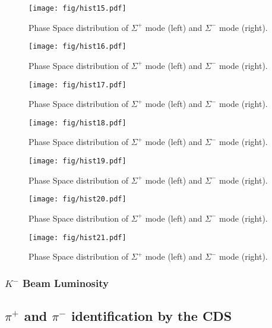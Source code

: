 \begin{figure}
\texttt{[image: fig/hist15.pdf]}
\caption{Phase Space distribution of $\Sigma^+$ mode (left) and $\Sigma^-$ mode (right).}
\end{figure}

\begin{figure}
\texttt{[image: fig/hist16.pdf]}
\caption{Phase Space distribution of $\Sigma^+$ mode (left) and $\Sigma^-$ mode (right).}
\end{figure}

\begin{figure}
\texttt{[image: fig/hist17.pdf]}
\caption{Phase Space distribution of $\Sigma^+$ mode (left) and $\Sigma^-$ mode (right).}
\end{figure}

\begin{figure}
\texttt{[image: fig/hist18.pdf]}
\caption{Phase Space distribution of $\Sigma^+$ mode (left) and $\Sigma^-$ mode (right).}
\end{figure}

\begin{figure}
\texttt{[image: fig/hist19.pdf]}
\caption{Phase Space distribution of $\Sigma^+$ mode (left) and $\Sigma^-$ mode (right).}
\end{figure}

\begin{figure}
\texttt{[image: fig/hist20.pdf]}
\caption{Phase Space distribution of $\Sigma^+$ mode (left) and $\Sigma^-$ mode (right).}
\end{figure}

\begin{figure}
\texttt{[image: fig/hist21.pdf]}
\caption{Phase Space distribution of $\Sigma^+$ mode (left) and $\Sigma^-$ mode (right).}
\end{figure}



\subsubsection{$K^-$ Beam Luminosity}



\subsection{$\pi^{+}$ and $\pi^{-}$ identification by the CDS}


